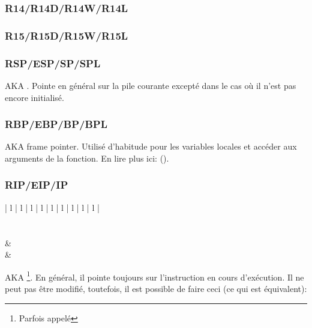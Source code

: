 \subsubsection{R14/R14D/R14W/R14L}

\subsubsection{R15/R15D/R15W/R15L}

\subsubsection{RSP/ESP/SP/SPL}

\ac{AKA} . Pointe en général sur la pile
courante excepté dans le cas où il n'est pas encore initialisé.

\subsubsection{RBP/EBP/BP/BPL}

\ac{AKA} frame pointer. Utilisé d'habitude pour les variables locales et accéder
aux arguments de la fonction. En lire plus ici: ().

\subsubsection{RIP/EIP/IP}

\begin{center}
\begin{tabular}{ | l | l | l | l | l | l | l | l | l |}
\hline
\RegHeaderTop \\
\hline
\RegHeader \\
\hline
{} \\
\hline
{} &  \\
\hline
{} &  \\
\hline
\end{tabular}
\end{center}

\ac{AKA} 
\footnote{Parfois appelé }.
En général, il pointe toujours sur l'instruction en cours d'exécution.
Il ne peut pas être modifié, toutefois, il est possible de faire ceci (ce qui est
équivalent):

